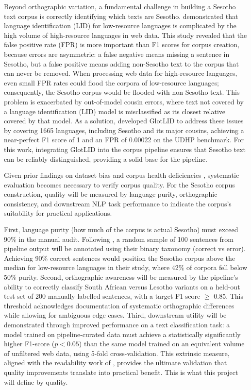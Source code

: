 \documentclass[11pt,a4paper]{article}
\begin{document}
Beyond orthographic variation, a fundamental challenge in building a Sesotho text corpus is correctly identifying which texts are Sesotho. \citet{kargaran2023glotlid} demonstrated that language identification (LID) for low-resource languages is complicated by the high volume of high-resource languages in web data. This study revealed that the false positive rate (FPR) is more important than F1 scores for corpus creation, because errors are asymmetric: a false negative means missing a sentence in Sesotho, but a false positive means adding non-Sesotho text to the corpus that can never be removed. When processing web data for high-resource languages, even small FPR rates could flood the corpora of low-resource languages; consequently, the Sesotho corpus would be flooded with non-Sesotho text. This problem is exacerbated by out-of-model cousin errors, where text not covered by a language identification (LID) model is misclassified as its closest relative covered by that model. As a solution, \citet{kargaran2023glotlid} developed GlotLID to address these issues by covering 1665 languages, including Sesotho and its major cousins, achieving a near-perfect F1 score of 1 and an FPR of 0.00022 on the UDHP benchmark. For this work, integrating GlotLID into the corpus pipeline ensures that Sesotho text can be reliably distinguished, providing a solid base for the pipeline.


\vspace{1em}
Given prior findings on dataset bias and corpus health deficiencies \citep{Mishra2020,Adebara2022}, systematic evaluation becomes necessary to verify corpus quality. For the Sesotho corpus construction, quality will be measured by language purity, orthographic consistency, and downstream NLP task performance to indicate the corpus's suitability for practical applications.
\vspace{1em}

First, language purity (how much of the corpus is actual Sesotho) must exceed 90\% in the manual audit. Following \citet{kreutzer-etal-2022-quality}, a random sample of 100 sentences from pipeline output will be annotated using their binary taxonomy (correct vs error). Achieving 90\% correct sentences would position the Sesotho corpus above the median for low-resource languages in their study, where 42\% of corpora fell below 50\% purity. Second, orthographic awareness will be measured by the pipeline's ability to correctly classify South African versus Lesotho variants on a held-out test set of 200 manually labelled sentences, with a target F1-score $\geq$ 0.85. This threshold acknowledges \citet{Makutoane2022} documentation of systematic orthographic differences while allowing for ambiguous edge cases. Third, downstream utility will be demonstrated through improved performance on a text classification task: a model trained on pipeline-curated data must achieve a statistically significantly higher F1-score ($p < 0.05$) than the same model trained on an equivalent volume of unfiltered web data, using 5-fold cross-validation. This extrinsic measure, aligned with the readability work of \citep{Sibeko2024}, provides the ultimate validation that quality improvements translate into practical benefit. This is what this project will define by quality.
\end{document}

